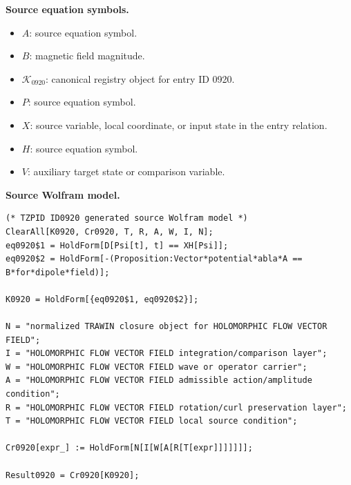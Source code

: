 \begin{minipage}[t]{0.49\linewidth}
\begingroup
\small
\raggedright
\textbf{Source equation symbols.}\par
\begin{itemize}[leftmargin=1.35em,itemsep=1pt,topsep=1pt,parsep=0pt]
    \item $A$: source equation symbol.
    \item $B$: magnetic field magnitude.
    \item $\mathcal{K}_{0920}$: canonical registry object for entry ID 0920.
    \item $P$: source equation symbol.
    \item $X$: source variable, local coordinate, or input state in the entry relation.
    \item $H$: source equation symbol.
    \item $V$: auxiliary target state or comparison variable.
\end{itemize}
\endgroup
\end{minipage}\hfill
\begin{minipage}[t]{0.47\linewidth}
\begingroup
\scriptsize
\raggedright
\textbf{Source Wolfram model.}\par
\begin{Verbatim}[fontsize=\tiny,breaklines=true,breakanywhere=true]
(* TZPID ID0920 generated source Wolfram model *)
ClearAll[K0920, Cr0920, T, R, A, W, I, N];
eq0920$1 = HoldForm[D[Psi[t], t] == XH[Psi]];
eq0920$2 = HoldForm[-(Proposition:Vector*potential*abla*A == B*for*dipole*field)];

K0920 = HoldForm[{eq0920$1, eq0920$2}];

N = "normalized TRAWIN closure object for HOLOMORPHIC FLOW VECTOR FIELD";
I = "HOLOMORPHIC FLOW VECTOR FIELD integration/comparison layer";
W = "HOLOMORPHIC FLOW VECTOR FIELD wave or operator carrier";
A = "HOLOMORPHIC FLOW VECTOR FIELD admissible action/amplitude condition";
R = "HOLOMORPHIC FLOW VECTOR FIELD rotation/curl preservation layer";
T = "HOLOMORPHIC FLOW VECTOR FIELD local source condition";

Cr0920[expr_] := HoldForm[N[I[W[A[R[T[expr]]]]]]];

Result0920 = Cr0920[K0920];
\end{Verbatim}
\endgroup
\end{minipage}

